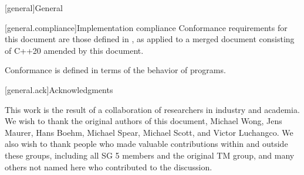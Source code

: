 [general]{General}

[general.compliance]{Implementation compliance}
\pnum
Conformance requirements for this document are those defined in , as applied to a merged document consisting of C++20 amended by this document.
\begin{note}
Conformance is defined in terms of the behavior of programs.
\end{note}

[general.ack]{Acknowledgments}

This work is the result of a collaboration of researchers in industry and academia. We wish to thank the
original authors of this document, Michael Wong, Jens Maurer, Hans Boehm, Michael Spear, Michael Scott, and Victor Luchangco. We also wish to thank people
who made valuable contributions within and outside these groups, including all SG 5 members and the original TM group, and many others not named
here who contributed to the discussion.
